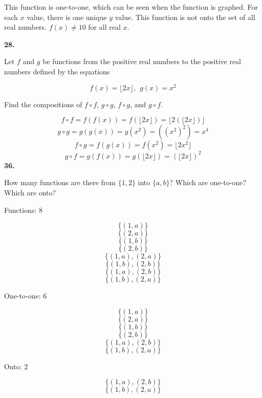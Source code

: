 \documentclass[12pt,titlepage]{article}
\begin{document}
This function is one-to-one, which can be seen when the function is graphed. For each
$x$ value, there is one unique $y$ value. This function is not onto the set of all real
numbers. $f(x) \neq 10$ for all real $x$.

\textbf{28.}

Let $f$ and $g$ be functions from the positive real numbers to the positive real numbers
defined by the equations

\[ f(x) = \lfloor 2x \rfloor, \ \  g(x) = x^2 \]

Find the compositions of $f \circ f$, $g \circ g$, $f \circ g$, and $g \circ f$.

\[ f \circ f = f(f(x)) = f(\lfloor 2x \rfloor) = \lfloor 2(\lfloor 2x \rfloor) \rfloor\]
\[ g \circ g = g(g(x)) = g(x^2) = ((x^2)^2) = x^4\]
\[ f \circ g = f(g(x)) = f(x^2) = \lfloor 2x^2 \rfloor\]
\[ g \circ f = g(f(x)) = g(\lfloor 2x \rfloor) = (\lfloor 2x \rfloor)^2\]
\textbf{36.}

How many functions are there from $\{1, 2\}$ into $\{a, b\}$? Which are one-to-one? Which are onto?

Functions: 8

\[ \{(1, a)\} \]
\[ \{(2, a)\} \]
\[ \{(1, b)\} \]
\[ \{(2, b)\} \]
\[ \{(1, a), (2, a)\} \]
\[ \{(1, b), (2, b)\} \]
\[ \{(1, a), (2, b)\} \]
\[ \{(1, b), (2, a)\} \]

One-to-one: 6

\[ \{(1, a)\} \]
\[ \{(2, a)\} \]
\[ \{(1, b)\} \]
\[ \{(2, b)\} \]
\[ \{(1, a), (2, b)\} \]
\[ \{(1, b), (2, a)\} \]

Onto: 2

\[ \{(1, a), (2, b)\} \]
\[ \{(1, b), (2, a)\} \]
\end{document}
